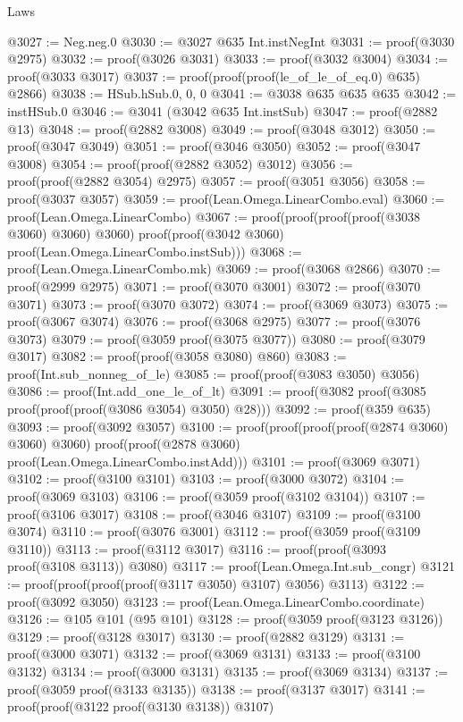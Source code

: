 \begin{lexlean}{Laws}
\begin{coremodule}
@3027 := Neg.neg.{0}
@3030 := @3027 @635 Int.instNegInt
@3031 := proof(@3030 @2975)
@3032 := proof(@3026 @3031)
@3033 := proof(@3032 @3004)
@3034 := proof(@3033 @3017)
@3037 := proof(proof(proof(le_of_le_of_eq.{0}) @635) @2866)
@3038 := HSub.hSub.{0, 0, 0}
@3041 := @3038 @635 @635 @635
@3042 := instHSub.{0}
@3046 := @3041 (@3042 @635 Int.instSub)
@3047 := proof(@2882 @13)
@3048 := proof(@2882 @3008)
@3049 := proof(@3048 @3012)
@3050 := proof(@3047 @3049)
@3051 := proof(@3046 @3050)
@3052 := proof(@3047 @3008)
@3054 := proof(proof(@2882 @3052) @3012)
@3056 := proof(proof(@2882 @3054) @2975)
@3057 := proof(@3051 @3056)
@3058 := proof(@3037 @3057)
@3059 := proof(Lean.Omega.LinearCombo.eval)
@3060 := proof(Lean.Omega.LinearCombo)
@3067 := proof(proof(proof(proof(@3038 @3060) @3060) @3060)
      proof(proof(@3042 @3060) proof(Lean.Omega.LinearCombo.instSub)))
@3068 := proof(Lean.Omega.LinearCombo.mk)
@3069 := proof(@3068 @2866)
@3070 := proof(@2999 @2975)
@3071 := proof(@3070 @3001)
@3072 := proof(@3070 @3071)
@3073 := proof(@3070 @3072)
@3074 := proof(@3069 @3073)
@3075 := proof(@3067 @3074)
@3076 := proof(@3068 @2975)
@3077 := proof(@3076 @3073)
@3079 := proof(@3059 proof(@3075 @3077))
@3080 := proof(@3079 @3017)
@3082 := proof(proof(@3058 @3080) @860)
@3083 := proof(Int.sub_nonneg_of_le)
@3085 := proof(proof(@3083 @3050) @3056)
@3086 := proof(Int.add_one_le_of_lt)
@3091 := proof(@3082 proof(@3085 proof(proof(proof(@3086 @3054) @3050) @28)))
@3092 := proof(@359 @635)
@3093 := proof(@3092 @3057)
@3100 := proof(proof(proof(proof(@2874 @3060) @3060) @3060)
      proof(proof(@2878 @3060) proof(Lean.Omega.LinearCombo.instAdd)))
@3101 := proof(@3069 @3071)
@3102 := proof(@3100 @3101)
@3103 := proof(@3000 @3072)
@3104 := proof(@3069 @3103)
@3106 := proof(@3059 proof(@3102 @3104))
@3107 := proof(@3106 @3017)
@3108 := proof(@3046 @3107)
@3109 := proof(@3100 @3074)
@3110 := proof(@3076 @3001)
@3112 := proof(@3059 proof(@3109 @3110))
@3113 := proof(@3112 @3017)
@3116 := proof(proof(@3093 proof(@3108 @3113)) @3080)
@3117 := proof(Lean.Omega.Int.sub_congr)
@3121 := proof(proof(proof(proof(@3117 @3050) @3107) @3056) @3113)
@3122 := proof(@3092 @3050)
@3123 := proof(Lean.Omega.LinearCombo.coordinate)
@3126 := @105 @101 (@95 @101)
@3128 := proof(@3059 proof(@3123 @3126))
@3129 := proof(@3128 @3017)
@3130 := proof(@2882 @3129)
@3131 := proof(@3000 @3071)
@3132 := proof(@3069 @3131)
@3133 := proof(@3100 @3132)
@3134 := proof(@3000 @3131)
@3135 := proof(@3069 @3134)
@3137 := proof(@3059 proof(@3133 @3135))
@3138 := proof(@3137 @3017)
@3141 := proof(proof(@3122 proof(@3130 @3138)) @3107)

\end{coremodule}
\end{lexlean}
